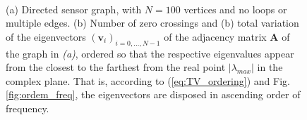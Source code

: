 \begin{figure}
	\centering
	~
	\caption{(a) Directed sensor graph, with $ N=100 $ vertices and no loops or multiple edges. (b) Number of zero crossings and (b) total variation of the eigenvectors $ (\mathbf{v}_i)_{i=0,\dots,N-1} $ of the adjacency matrix $ \mathbf{A} $ of the graph in \emph{(a)}, ordered so that the respective eigenvalues appear from the closest to the farthest from the real point $ |\lambda_{max}| $ in the complex plane. That is, according to (\ref{eq:TV_ordering}) and Fig. \ref{fig:ordem_freq}, the eigenvectors are disposed in ascending order of frequency.}
	\label{fig:showing_random_sensor_spectrum_directed}
\end{figure}

